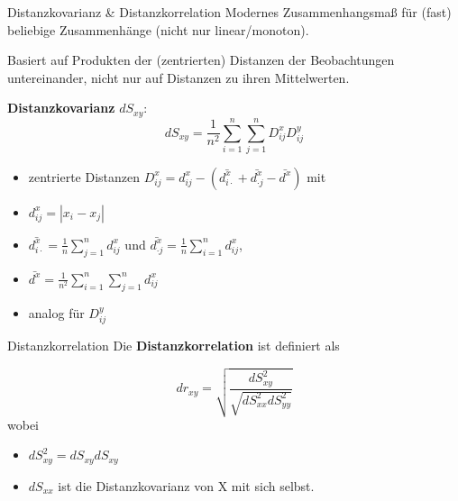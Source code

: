 \documentclass[
  10pt,
  ignorenonframetext,
]{beamer}
\providecommand{\tightlist}{%
  \setlength{\itemsep}{0pt}\setlength{\parskip}{0pt}}
\begin{document}
\begin{frame}{Distanzkovarianz \& Distanzkorrelation}
\protect\hypertarget{distanzkovarianz-distanzkorrelation}{}
Modernes Zusammenhangsmaß für (fast) beliebige Zusammenhänge (nicht nur
linear/monoton).

Basiert auf Produkten der (zentrierten) Distanzen der Beobachtungen
untereinander, nicht nur auf Distanzen zu ihren Mittelwerten.

\textbf{Distanzkovarianz} \(dS_{xy}\):
\[dS_{xy} = \frac{1}{n^2}\sum^n_{i=1}\sum^n_{j=1}D^x_{ij}D^y_{ij}\]

\begin{itemize}
\tightlist
\item
  zentrierte Distanzen
  \(D^x_{ij} = d^x_{i j} - \left(\bar{d^x_{i \cdot}} + \bar{d^x_{\cdot j}} - \bar{d^x}\right)\)
  mit
\item
  \(d^x_{i j} = |x_i - x_j|\)
\item
  \(\bar{d^x_{i \cdot}} = \frac{1}{n} \sum^n_{j=1} d^x_{i j}\) und
  \(\bar{d^x_{\cdot j}} = \frac{1}{n} \sum^n_{i=1} d^x_{i j}\),
\item
  \(\bar{d^x} = \frac{1}{n^2} \sum^n_{i=1}\sum^n_{j=1} d^x_{i j}\)
\item
  analog für \(D^y_{ij}\)
\end{itemize}
\end{frame}

\begin{frame}{Distanzkorrelation}
\protect\hypertarget{distanzkorrelation}{}
Die \textbf{Distanzkorrelation} ist definiert als

\[dr_{xy} = \sqrt{\frac{dS^2_{xy}}{\sqrt{dS^2_{xx}dS^2_{yy}}}}\] wobei

\begin{itemize}
\tightlist
\item
  \(dS^2_{xy} = dS_{xy}dS_{xy}\)
\item
  \(dS_{xx}\) ist die Distanzkovarianz von X mit sich selbst.
\end{itemize}
\end{frame}
\end{document}
